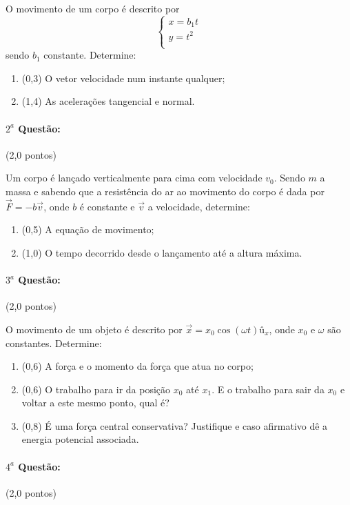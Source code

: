 \documentclass[12pt,a4paper]{article}
\begin{document}
O movimento de um corpo é descrito por
$$
\begin{cases}
x= b_1 t \\
y=t^2 \\
\end{cases}
$$
sendo $b_1$ constante. Determine:
\begin{enumerate}[label=\alph*)]
\item (0,3) O vetor velocidade num instante qualquer;
\item (1,4) As acelerações tangencial e normal.
\end{enumerate}

\paragraph{$2^a$ Questão:} (2,0 pontos)

Um corpo é lançado verticalmente para cima com velocidade $v_0$. Sendo $m$ a massa e sabendo que a resistência do ar ao movimento
do corpo é dada por $\overrightarrow{F}=-b\overrightarrow{v}$, onde $b$ é constante e $\overrightarrow{v}$ a velocidade, determine:
\begin{enumerate}[label=\alph*)]
\item (0,5) A equação de movimento;
\item (1,0) O tempo decorrido desde o lançamento até a altura máxima.
\end{enumerate}

\paragraph{$3^a$ Questão:} (2,0 pontos)

O movimento de um objeto é descrito por $\overrightarrow{x}=x_0 \cos (\omega t) \textrm{û}_x$, onde $x_0$ e $\omega$ são constantes. Determine:

\begin{enumerate}[label=\alph*)]
\item (0,6) A força e o momento da força que atua no corpo;
\item (0,6) O trabalho para ir da posição $x_0$ até $x_1$. E o trabalho para sair da $x_0$ e voltar a este mesmo ponto, qual é?
\item (0,8) É uma força central conservativa? Justifique e caso afirmativo dê a energia potencial associada.
\end{enumerate}

\paragraph{$4^a$ Questão:} (2,0 pontos)
\end{document}
